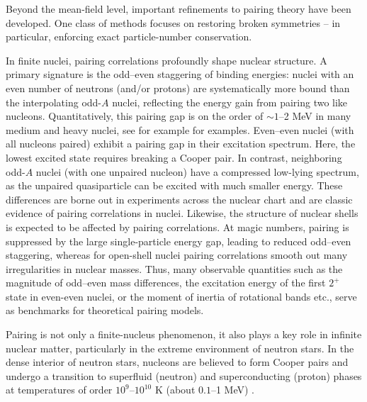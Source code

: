 Beyond the mean-field level, important refinements to pairing theory have been developed. One class of methods focuses on restoring broken symmetries – in particular, enforcing exact particle-number conservation. 

In finite nuclei, pairing correlations profoundly shape nuclear structure. A primary signature is the odd–even staggering of binding energies: nuclei with an even number of neutrons (and/or protons) are systematically more bound than the interpolating odd-$A$ nuclei, reflecting the energy gain from pairing two like nucleons. Quantitatively, this pairing gap is on the order of $\sim1$–2 MeV in many medium and heavy nuclei, see for example \cite{Dean2003} for examples. Even–even nuclei (with all nucleons paired) exhibit a pairing gap in their excitation spectrum. Here, the lowest excited state requires breaking a Cooper pair. In contrast, neighboring odd-$A$ nuclei (with one unpaired nucleon) have a compressed low-lying spectrum, as the unpaired quasiparticle can be excited with much smaller energy. These differences are borne out in experiments across the nuclear chart and are classic evidence of pairing correlations in nuclei. Likewise, the structure of nuclear shells is expected to be affected  by pairing correlations. At magic numbers, pairing is suppressed by the large single-particle energy gap, leading to reduced odd–even staggering, whereas for open-shell nuclei pairing correlations  smooth out many irregularities in nuclear masses.
Thus, many observable quantities such as  the magnitude of odd–even mass differences, the excitation energy of the first $2^+$ state in even-even nuclei, or the moment of inertia of rotational bands etc., serve as benchmarks for theoretical pairing models.


Pairing is not only a finite-nucleus phenomenon, it also plays a key role in infinite nuclear matter, particularly in the extreme environment of neutron stars. In the dense interior of neutron stars, nucleons are believed to form Cooper pairs and undergo a transition to superfluid (neutron) and superconducting (proton) phases at temperatures of order $10^9$–$10^{10}$ K (about $0.1$–1 MeV) \cite{Dean2003}.


